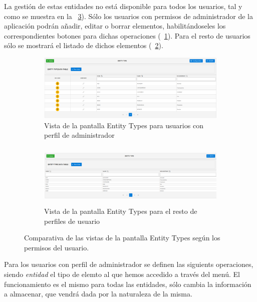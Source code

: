 La gestión de estas entidades no está disponible para todos los usuarios, tal y como se muestra en la \figurename~\ref{fig:parametrizacion}). Sólo los usuarios con permisos de administrador de la aplicación podrán añadir, editar o borrar elementos, habilitándoseles los correspondientes botones para dichas operaciones (\figurename~\ref{fig:parametrizacion-admin}). Para el resto de usuarios sólo se mostrará el listado de dichos elementos (\figurename~\ref{fig:parametrizacion-usuario}).


\begin{figure}[H]
  \centering
  \begin{subfigure}[c]{0.9\textwidth}
    \includegraphics[width=\textwidth]{imaxes/entity-type-admin.png}
    \caption{Vista de la pantalla Entity Types para usuarios con perfil de administrador\newline}
    \label{fig:parametrizacion-admin}
  \end{subfigure}
  \begin{subfigure}[c]{0.9\textwidth}
    \includegraphics[width=\textwidth,height=3cm]{imaxes/entity-type-usuario.png}
    \caption{Vista de la pantalla Entity Types para el resto de perfiles de usuario}
    \label{fig:parametrizacion-usuario}
  \end{subfigure}
  \caption{Comparativa de las vistas de la pantalla Entity Types según los permisos del usuario.}
  \label{fig:parametrizacion}
\end{figure}

Para los usuarios con perfil de administrador se definen las siguients operaciones, siendo \textit{entidad} el tipo de elemto al que hemos accedido a través del menú. El funcionamiento es el mismo para todas las entidades, sólo cambia la información a almacenar, que vendrá dada por la naturaleza de la misma.


